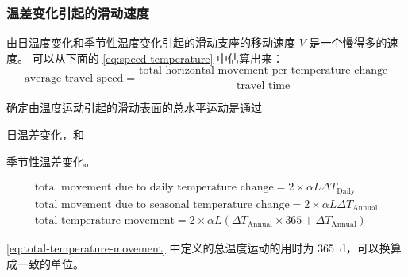 \subsubsection{温差变化引起的滑动速度}
由日温度变化和季节性温度变化引起的滑动支座的移动速度 $V$ 是一个慢得多的速度。 可以从下面的 \cref{eq:speed-temperature} 中估算出来：
\begin{equation}
  \label{eq:speed-temperature}
  \text{average travel speed} = \frac{\text{total horizontal movement per temperature change}}{\text{travel time}}
\end{equation}

确定由温度运动引起的滑动表面的总水平运动是通过
\begin{enumerate*}
  \item 日温差变化，和
  \item 季节性温差变化。
\end{enumerate*}
\begin{gather}
  \text{total movement due to daily temperature change}= 2 \times \alpha L \Delta T_\text{Daily}\\
  \text{total movement due to seasonal temperature change}= 2 \times \alpha L \Delta T_\text{Annual}\\
  \label{eq:total-temperature-movement}
  \text{total temperature movement}= 2 \times \alpha L \left( \Delta T_\text{Annual} \times 365 + \Delta T_\text{Annual}\right)
\end{gather}


\cref{eq:total-temperature-movement} 中定义的总温度运动的用时为 \qty{365}{d}，可以换算成一致的单位。

